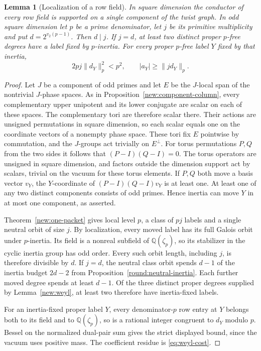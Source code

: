 \documentclass[11pt]{amsart}
\numberwithin{equation}{section}
\newtheorem{lemma}[theorem]{Lemma}
\theoremstyle{definition}
\theoremstyle{plain}
\newcommand{\QQ}{\mathbb Q}
\begin{document}
\begin{lemma}[Localization of a row field]\label{odd:field-component}
In square dimension the conductor of every row field is supported
on a single component of the twist graph. In odd square dimension let $p$
be a prime denominator, let $j$ be its primitive multiplicity and put
$d=2^{v_2(p-1)}$. Then $d\mid j$. If $j=d$, at least two distinct
proper $p$-free degrees have a label fixed by $p$-inertia.
For every proper $p$-free label $Y$ fixed by that inertia,
\[
      2pj\|d_Y\|_p^2<p^2,\qquad
      |a_Y|\ge \|j d_Y\|_p .
\]
\end{lemma}
\begin{proof}
Let $J$ be a component of odd primes and let $E$ be the $J$-local
span of the nontrivial $J$-phase spaces. As in
Proposition~\ref{new:component-column}, every complementary upper
unipotent and its lower conjugate are scalar on each of these spaces.
The complementary tori are therefore scalar there. Their actions
are unsigned permutations in square dimension, so each scalar equals
one on the coordinate vectors of a nonempty phase space. These tori
fix $E$ pointwise by commutation, and the $J$-groups act trivially
on $E^\perp$. For torus permutations $P,Q$ from the two sides it follows
that $(P-I)(Q-I)=0$. The torus operators are unsigned in square
dimension, and factors outside the dimension support act by scalars,
trivial on the vacuum for these torus elements. If $P,Q$ both move
a basis vector $v_Y$, the $Y$-coordinate of
$(P-I)(Q-I)v_Y$ is at least one. At least one of any two distinct
components consists of odd primes. Hence inertia can move $Y$ in
at most one component, as asserted.

Theorem~\ref{new:one-packet} gives local level $p$, a class of
$pj$ labels and a single neutral orbit of size $j$. By localization,
every moved label has its full Galois orbit under $p$-inertia.
Its field is a nonreal subfield of $\QQ(\zeta_p)$, so its stabilizer
in the cyclic inertia group has odd order. Every such orbit length,
including $j$, is therefore divisible by $d$.
If $j=d$, the neutral class orbit spends $d-1$ of the inertia
budget $2d-2$ from Proposition~\ref{round:neutral-inertia}.
Each further moved degree spends at least $d-1$. Of the three distinct
proper degrees supplied by Lemma~\ref{new:weyl}, at least two
therefore have inertia-fixed labels.

For an inertia-fixed proper label $Y$, every denominator-$p$ row
entry at $Y$ belongs both to its field and to $\QQ(\zeta_p)$,
so is a rational integer congruent to $d_Y$ modulo $p$.
Bessel on the normalized dual-pair sum gives the strict displayed
bound, since the vacuum uses positive mass. The coefficient residue
is \eqref{eq:weyl-cost}.
\end{proof}
\end{document}
